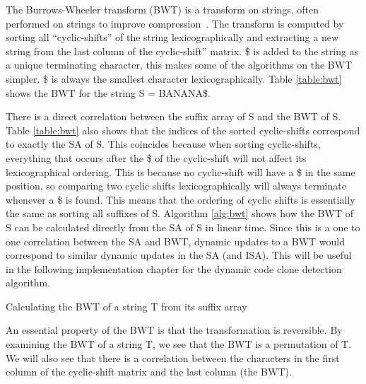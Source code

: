 The Burrows-Wheeler transform (BWT) is a transform on strings, often performed on strings
to improve compression~\cite{BWT}. The transform is computed by sorting all
``cyclic-shifts'' of the string lexicographically and extracting a new string from the
last column of the cyclic-shift'' matrix. \$ is added to the string as a unique
terminating character, this makes some of the algorithms on the BWT simpler. \$ is always
the smallest character lexicographically. Table \ref{table:bwt} shows the BWT for the
string S = BANANA\$.

There is a direct correlation between the suffix array of S and the BWT of S. Table
\ref{table:bwt} also shows that the indices of the sorted cyclic-shifts correspond to
exactly the SA of S. This coincides because when sorting cyclic-shifts, everything that
occurs after the \$ of the cyclic-shift will not affect its lexicographical ordering. This
is because no cyclic-shift will have a \$ in the same position, so comparing two cyclic
shifts lexicographically will always terminate whenever a \$ is found. This means that the
ordering of cyclic shifts is essentially the same as sorting all suffixes of S. Algorithm
\ref{alg:bwt} shows how the BWT of S can be calculated directly from the SA of S in linear
time. Since this is a one to one correlation between the SA and BWT, dynamic updates to a BWT
would correspond to similar dynamic updates in the SA (and ISA). This will be useful in
the following implementation chapter for the dynamic code clone detection algorithm.

\begin{algorithm}[htp]
  \SetAlgoLined\DontPrintSemicolon

  \vspace{0.5cm}
  \caption{Calculating the BWT of a string T from its suffix array}
  \label{alg:bwt}
\end{algorithm}


An essential property of the BWT is that the transformation is reversible. By examining
the BWT of a string T, we see that the BWT is a permutation of T. We will also see that
there is a correlation between the characters in the first column of the cyclic-shift
matrix and the last column (the BWT).

